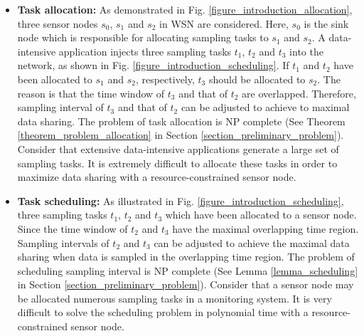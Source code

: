\documentclass[prodmode,acmtosn]{acmsmall}
\begin{document}
\begin{itemize}
\item{\bf{Task allocation:}} As demonstrated in Fig. \ref{figure_introduction_allocation}, three sensor nodes $s_0$, $s_1$ and $s_2$ in WSN are considered. Here, $s_0$ is the sink node which is responsible for  allocating sampling tasks to $s_1$ and $s_2$. A data-intensive application injects three sampling tasks  $t_1$, $t_2$ and $t_3$ into the network, as shown in Fig. \ref{figure_introduction_scheduling}. If $t_1$ and $t_2$ have been allocated to $s_1$ and $s_2$, respectively, $t_3$ should be allocated to $s_2$. The reason is that the time window of $t_3$ and that of $t_2$ are overlapped. Therefore,  sampling interval of $t_3$ and that of $t_2$ can be adjusted to achieve to maximal data sharing. The problem of task allocation is NP complete (See Theorem \ref{theorem_problem_allocation} in Section \ref{section_preliminary_problem}). Consider that extensive data-intensive applications generate a large set of sampling tasks. It is extremely difficult to allocate these tasks in order to maximize data sharing with a resource-constrained sensor node.

\item{\bf{Task scheduling:}} As illustrated in Fig. \ref{figure_introduction_scheduling}, three sampling tasks $t_1$, $t_2$ and $t_3$ which have been allocated to a sensor node. Since the time window of $t_2$ and $t_3$ have the maximal overlapping time region. Sampling intervals of $t_2$ and $t_3$ can be adjusted to achieve the maximal data sharing when data is sampled in the overlapping time region. The problem of scheduling sampling interval is NP complete (See Lemma \ref{lemma_scheduling} in Section \ref{section_preliminary_problem}). Consider that a sensor node may be allocated numerous sampling tasks in a monitoring system. It is very difficult to solve the scheduling problem in polynomial time with a resource-constrained sensor node.
\end{itemize}
\end{document}
